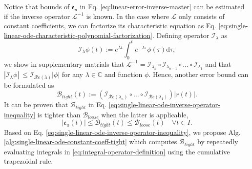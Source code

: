 \documentclass[accepted]{uai2023}
\newcommand{\Err}{\mathfrak{e}}
\newcommand{\Bound}{\mathcal{B}}
\renewcommand{\L}{\mathcal{L}}
\newcommand{\I}{\mathcal{I}}
\renewcommand{\Re}[1]{\mathcal{R}e\left(#1\right)}
\begin{document}
    Notice that bounds of $\Err_u$ in Eq. \ref{eq:linear-error-inverse-master} can be estimated if the inverse operator $\L^{-1}$ is known. 
    In the case where $\L$ only consists of constant coefficients, we can factorize its characteristic equation as Eq. \ref{eq:single-linear-ode-characteristic-polynomial-factorization}.
    Defining operator $\I_{\lambda}$ as 
    \begin{equation} \label{eq:integral-operator-definition}
        \I_\lambda \phi(t) := e^{{\lambda} t} \int_{0}^{t} e^{-{\lambda} \tau} \phi(\tau) \mathrm{d}\tau,
    \end{equation}
    we show in supplementary matrials that $\L^{-1} = \I_{\lambda_{n}} \circ \I_{\lambda_{n-1}} \circ \dots \circ \I_{\lambda_1}$ and that $\left|\I_{\lambda} \phi\right| \ \leq \I_{\Re{\lambda}} |\phi|$ for any $\lambda \in \mathbb{C}$ and function $\phi$.
    Hence, another error bound can be formulated as
    \begin{equation} \label{eq:single-linear-ode-inverse-operator-inequality}
        \Bound_{tight}(t) := \left(\I_{\Re{\lambda_{n}}} \circ \dots \circ \I_{\Re{\lambda_1}}\right) |r(t)|.
    \end{equation}
    It can be proven that $\Bound_{tight}$ in Eq. \ref{eq:single-linear-ode-inverse-operator-inequality} is tighter than $\Bound_{loose}$ when the latter is applicable,
    \begin{equation}
        \left|\Err_u(t)\right| \leq \Bound_{tight}(t) \leq \Bound_{loose}(t) \quad \forall t \in I.
    \end{equation}
    Based on Eq. \ref{eq:single-linear-ode-inverse-operator-inequality}, we propose Alg. \ref{alg:single-linear-ode-constant-coeff-tight} which computes $\Bound_{tight}$ by repeatedly evaluating integrals in \ref{eq:integral-operator-definition} using the cumulative trapezoidal rule.
\end{document}
